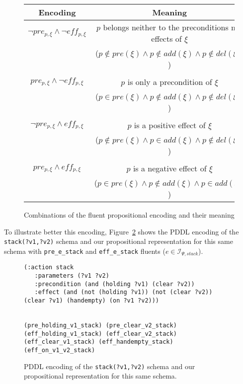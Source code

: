 \documentclass[runningheads]{llncs}
\begin{document}
\begin{figure}
	\begin{footnotesize}
		\begin{tabular}{c@{\hskip .2in} |@{\hskip .1in} c}
	{\bf Encoding} & {\bf Meaning}\\\hline
$\neg pre_{p,\xi} \wedge \neg eff_{p,\xi} $& $p$ belongs neither to the preconditions nor effects of $\xi$ \\
             & ($p \notin pre(\xi) \wedge p \notin add(\xi) \wedge p \notin del(\xi)$)\\\\
$pre_{p,\xi} \wedge \neg eff_{p,\xi} $& $p$ is only a precondition of $\xi$\\
               &  ($p \in pre(\xi) \wedge p \notin add(\xi) \wedge p \notin del(\xi)$) \\\\
$\neg pre_{p,\xi} \wedge eff_{p,\xi} $& $p$ is a positive effect of $\xi$ \\
               &  ($p \notin pre(\xi) \wedge p \in add(\xi) \wedge p \notin del(\xi)$) \\\\
$pre_{p,\xi} \wedge eff_{p,\xi} $& $p$ is a negative effect of $\xi$ \\
               &  ($p \in pre(\xi) \wedge p \notin add(\xi) \wedge p \in add(\xi)$)
		\end{tabular}
	\end{footnotesize}
	\caption{\small Combinations of the fluent propositional encoding and their meaning}
	\label{fig:combinations}
\end{figure}

To illustrate better this encoding, Figure~\ref{fig:propositional} shows the PDDL encoding of the {\tt\small stack(?v1,?v2)} schema and our propositional representation for this same schema with {\tt\small pre\_e\_stack} and {\tt\small eff\_e\_stack} fluents ($e\in{\mathcal I}_{\Psi,stack}$). 

\begin{figure}
  \begin{small}  
  \begin{verbatim}
(:action stack
   :parameters (?v1 ?v2)
   :precondition (and (holding ?v1) (clear ?v2))
   :effect (and (not (holding ?v1)) (not (clear ?v2)) (clear ?v1) (handempty) (on ?v1 ?v2)))


(pre_holding_v1_stack) (pre_clear_v2_stack)
(eff_holding_v1_stack) (eff_clear_v2_stack)
(eff_clear_v1_stack) (eff_handempty_stack) (eff_on_v1_v2_stack)
  \end{verbatim}           
  \end{small}  
 \caption{\small PDDL encoding of the {\tt\small stack(?v1,?v2)} schema and our propositional representation for this same schema.}
\label{fig:propositional}
\end{figure}
\end{document}
